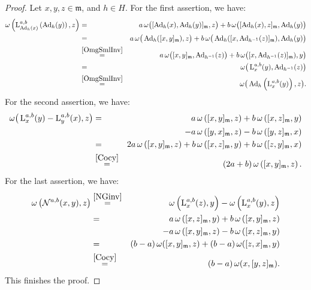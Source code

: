 \documentclass[10pt,a4paper]{amsart}
\newcommand{\Ad}{\operatorname{Ad}}
\newcommand{\lab}{\operatorname{L}^{a,b}}
\newcommand{\m}{\mathfrak{m}}
\newcommand{\w}{\omega}
\begin{document}
\begin{proof}
Let $x,y,z\in\mathfrak{m}$, and $h\in H$. For the first assertion, we have:
\begin{eqnarray*}
\omega\left(\lab_{\Ad_h(x)}\left(\Ad_h(y)\right),z\right)&=&a\,\omega\big([\Ad_h(x),\Ad_h(y)]_\mathfrak{m},z\big)+b\,\omega\big([\Ad_h(x),z]_\mathfrak{m},\Ad_h(y)\big)\\
&=&a\,\omega\big(\Ad_h([x,y]_\mathfrak{m}),z\big)+b\,\omega\big(\Ad_h([x,\Ad_{h^{-1}}(z)]_\mathfrak{m}),\Ad_h(y)\big)\\
&\stackrel{\rm\eqref{OmgSmlInv}}{=}&a\,\omega\big([x,y]_\mathfrak{m},\Ad_{h^{-1}}(z)\big)+b\,\omega\big([x,\Ad_{h^{-1}}(z)]_\mathfrak{m}),y\big)\\
&=&\omega\big(\lab_x(y),\Ad_{h^{-1}}(z)\big)\\
&\stackrel{\rm\eqref{OmgSmlInv}}{=}&\omega\big(\Ad_{h}\left(\lab_x(y)\right),z\big).
\end{eqnarray*}
For the second assertion, we have:
\begin{eqnarray*}
\omega\big(\lab_x(y)-\lab_y(x),z\big)&=&a\,\omega\left([x,y]_\mathfrak{m},z\right)+b\,\omega\left([x,z]_\mathfrak{m},y\right)\\
&&-a\,\omega\left([y,x]_\mathfrak{m},z\right)-b\,\omega\left([y,z]_\mathfrak{m},x\right)\\
&=&2a\,\omega\left([x,y]_\mathfrak{m},z\right)+b\,\omega\left([x,z]_\mathfrak{m},y\right)+b\,\omega\left([z,y]_\mathfrak{m},x\right)\\
&\stackrel{\rm\eqref{Cocy}}{=}&(2a+b)\,\omega\left([x,y]_\mathfrak{m},z\right).
\end{eqnarray*}
For the last assertion, we have:
\begin{eqnarray*}
\omega\left(\mathcal{N}^{a,b}(x,y),z\right)&\stackrel{\rm\eqref{NGinv}}{=}&\omega\left(\lab_x(z),y\right)-\omega\left(\lab_x(y),z\right)\\
&=&a\,\omega\left([x,z]_\mathfrak{m},y\right)+b\,\omega\left([x,y]_\mathfrak{m},z\right)\\
&&-a\,\omega\left([x,y]_\mathfrak{m},z\right)-b\,\omega\left([x,z]_\mathfrak{m},y\right)\\
&=&(b-a)\,\w([x,y]_\m,z)+(b-a)\,\w([z,x]_\m,y)\\
&\stackrel{\rm\eqref{Cocy}}{=}&(b-a)\,\w(x,[y,z]_\m).
\end{eqnarray*}
This finishes the proof.
\end{proof}
\end{document}
